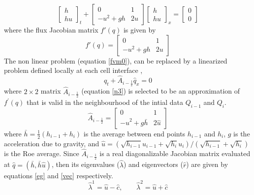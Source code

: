 \documentclass[12pt,a4paper]{article}
\begin{document}
	\begin{equation}
		\begin{bmatrix} h \\ hu \end{bmatrix}_t + 
		\begin{bmatrix} 0 &  1 \\ -u^{2} + gh & 2u \end{bmatrix} 
		\begin{bmatrix} h \\ hu \end{bmatrix}_x =  
		\begin{bmatrix} 0 \\ 0 \end{bmatrix}
		\label{p4}
	\end{equation}
	where the flux Jacobian matrix $f'(q)$ is given by 
	\begin{equation}
	f'(q) = \begin{bmatrix} 0 &  1 \\ -u^{2} + gh & 2u \end{bmatrix} 
	\end{equation}
	The non linear problem (equation \eqref{fvm0}), can be replaced by a linearized problem defined locally at each cell interface \cite{le-ge-be:2011},
	\begin{equation}
		\hat{q}_t + \hat{A}_{i-\frac{1}{2}}  \hat{q}_x  = 0
		\label{n2}
	\end{equation}
	  where $2 \times 2$ matrix $\hat{A}_{i-\frac{1}{2}} $ (equation \eqref{n3}) is selected to be an approximation of $f^{\prime}(q)$ that is valid in the neighbourhood of the intial data $Q_{i-1}$ and $Q_{i}$.
	\begin{equation}
		\hat{A}_{i-\frac{1}{2}} =  \begin{bmatrix} 0 &  1 \\ -\hat{u}^{2} + g\bar{h} & 2\hat{u} \end{bmatrix} 
		\label{n3}
	\end{equation}
	  where $\bar{h} = \frac{1}{2}(h_{i-1} + h_{i})$ is the average between end points $h_{i-1}$ and $h_{i}$, $g$ is the acceleration due to gravity, and $\hat{u} = (\sqrt{h_{i-1} }u_{i-1} + \sqrt{h_i}u_i)/(\sqrt{h_{i-1}} + \sqrt{h_i})$ is the Roe average. Since $\hat{A}_{i-\frac{1}{2}} $ is a real diagonalizable Jacobian matrix evaluated at $\hat{q} = (\bar{h},\bar{h}\hat{u})$, then its eigenvalues ($\hat{\lambda}$) and eigenvectors ($\hat{r}$) are given by equations  \eqref{eg} and \eqref{vec} respectively.
	\begin{equation}
		\hat{\lambda}^1 = \hat{u} - \hat{c}, \qquad 	\hat{\lambda}^2 = \hat{u} + \hat{c}
		\label{eg}
	\end{equation}
	
\end{document}
